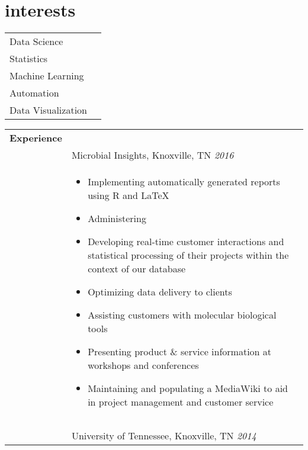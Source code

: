 \documentclass[10pt]{article}
\begin{document}
\begin{minipage}[ht]{.25\linewidth}
   \section*{interests}
   \begin{tabularx}{\linewidth}{p{.5\linewidth}p{.5\linewidth}}
      Data Science & \\
      Statistics & \\
      Machine Learning & \\
      Automation & \\
      Data Visualization &
   \end{tabularx}
\end{minipage}
\begin{minipage}[ht]{.75\linewidth}
   \bgroup
   \def\arraystretch{.8}
   \begin{tabularx}{\linewidth}{p{1.8cm}M}
      \hline
      \textbf{Experience} &  \\
      & Microbial Insights, Knoxville, TN \textit{2016} \\
      & \begin{itemize}[topsep=-12pt,parsep=0em]
            \setlength\itemsep{0em}
            \item Implementing automatically generated reports using R and \LaTeX %
            \item Administering 
            \item Developing real-time customer interactions and statistical processing of their projects within the context of our database %
            \item Optimizing data delivery to clients  %
            \item Assisting customers with molecular biological tools %
            \item Presenting product \& service information at workshops and conferences %
            \item Maintaining and populating a MediaWiki to aid in project management and customer service 
        \end{itemize} \\ 
       &  \\
       &  \\
       & University of Tennessee, Knoxville, TN \textit{2014} \\

\end{tabularx}
\end{minipage}
\end{document}
